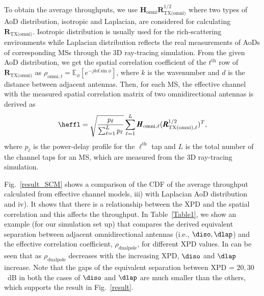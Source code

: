 \documentclass[journal]{IEEEtran}
\begin{document}
To obtain the average throughputs, we use $\pmb{H}_\text{omni}\pmb{R}_\text{TX(omni)}^{1/2}$ where two types of AoD distribution, isotropic and Laplacian, are considered for calculating $\pmb{R}_\text{TX(omni)}$. Isotropic distribution is usually used for the rich-scattering environments while Laplacian distribution reflects the real measurements of AoDs of corresponding MSs through the 3D ray-tracing simulation. From the given AoD distribution, we get the spatial correlation coefficient of the $t^\text{th}$ row of ${\pmb{R}_\text{TX(omni)}}$ as
$\rho_{\text{omni},t} = \mathbb{E}_{\phi}[e^{-jkd\sin\phi}]$,
where $k$ is the wavenumber and $d$ is the distance between adjacent antennas. 
Then, for each MS, the effective channel with the measured spatial correlation matrix of two omnidirectional antennas is derived as
\begin{equation}
\heffl=\sqrt{\frac{p_\ell}{\sum_{\ell=1}^{L}p_\ell}}\sum\limits_{\ell=1}^{L}{{\pmb{H}_{\text{omni},\ell}}({\pmb{R}_{\text{TX(omni)},\ell}^{1/2}})^T},
\label{heff_iso}
\end{equation}
where $p_\ell$ is the power-delay profile for the $\ell^\text{th}$ tap and $L$ is the total number of the channel taps for an MS, which are measured from the 3D ray-tracing simulation.

Fig.~\ref{result_SCM} shows a comparison of the CDF of the average throughput calculated from effective channel models, iii) with Laplacian AoD distribution and iv). It shows that there is a relationship between the XPD and the spatial correlation and this affects the throughput.
In Table~\ref{Table1}, we show an example (for our simulation set up) that compares the derived equivalent separation between adjacent omnidirectional antennas (i.e., $\diso, \dlap$) and the effective correlation coefficient, $\rho_{\textrm{dualpole}}$, for different XPD values. In can be seen that as $\rho_{\textrm{dualpole}}$ decreases with the increasing XPD, $\diso$ and $\dlap$ increase.
Note that the gaps of the equivalent separation between XPD = $20, 30$~dB in both the cases of $\diso$ and $\dlap$ are much smaller than the others, which supports the result in Fig.~\ref{result}. 
%
\end{document}
